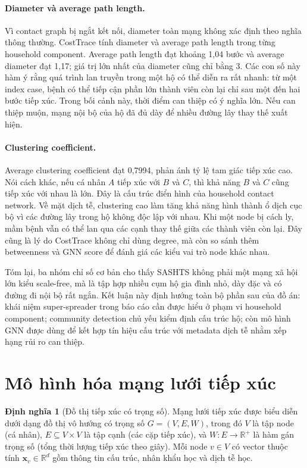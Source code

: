 \documentclass[12pt,a4paper]{report}
\theoremstyle{definition}
\newtheorem{definition}{Định nghĩa}[chapter]
\begin{document}
\paragraph{Diameter và average path length.}
Vì contact graph bị ngắt kết nối, diameter toàn mạng không xác định theo nghĩa thông thường. CostTrace tính diameter và average path length trong từng household component. Average path length đạt khoảng 1,04 bước và average diameter đạt 1,17; giá trị lớn nhất của diameter cũng chỉ bằng 3. Các con số này hàm ý rằng quá trình lan truyền trong một hộ có thể diễn ra rất nhanh: từ một index case, bệnh có thể tiếp cận phần lớn thành viên còn lại chỉ sau một đến hai bước tiếp xúc. Trong bối cảnh này, thời điểm can thiệp có ý nghĩa lớn. Nếu can thiệp muộn, mạng nội bộ của hộ đã đủ dày để nhiều đường lây thay thế xuất hiện.

\paragraph{Clustering coefficient.}
Average clustering coefficient đạt 0,7994, phản ánh tỷ lệ tam giác tiếp xúc cao. Nói cách khác, nếu cá nhân $A$ tiếp xúc với $B$ và $C$, thì khả năng $B$ và $C$ cũng tiếp xúc với nhau là lớn. Đây là cấu trúc điển hình của household contact network. Về mặt dịch tễ, clustering cao làm tăng khả năng hình thành ổ dịch cục bộ vì các đường lây trong hộ không độc lập với nhau. Khi một node bị cách ly, mầm bệnh vẫn có thể lan qua các cạnh thay thế giữa các thành viên còn lại. Đây cũng là lý do CostTrace không chỉ dùng degree, mà còn so sánh thêm betweenness và GNN score để đánh giá các kiểu vai trò node khác nhau.

Tóm lại, ba nhóm chỉ số cơ bản cho thấy SASHTS không phải một mạng xã hội lớn kiểu scale-free, mà là tập hợp nhiều cụm hộ gia đình nhỏ, dày đặc và có đường đi nội bộ rất ngắn. Kết luận này định hướng toàn bộ phần sau của đồ án: khái niệm super-spreader trong báo cáo cần được hiểu ở phạm vi household component; community detection chủ yếu kiểm định cấu trúc hộ; còn mô hình GNN được dùng để kết hợp tín hiệu cấu trúc với metadata dịch tễ nhằm xếp hạng rủi ro can thiệp.

\section{Mô hình hóa mạng lưới tiếp xúc}

\begin{definition}[Đồ thị tiếp xúc có trọng số]
Mạng lưới tiếp xúc được biểu diễn dưới dạng đồ thị vô hướng có trọng số $G=(V,E,W)$, trong đó $V$ là tập node (cá nhân), $E \subseteq V \times V$ là tập cạnh (các cặp tiếp xúc), và $W: E \rightarrow \mathbb{R}^+$ là hàm gán trọng số (tổng thời lượng tiếp xúc theo giây). Mỗi node $v \in V$ có vector thuộc tính $\mathbf{x}_v \in \mathbb{R}^d$ gồm thông tin cấu trúc, nhân khẩu học và dịch tễ học.
\end{definition}
\end{document}
